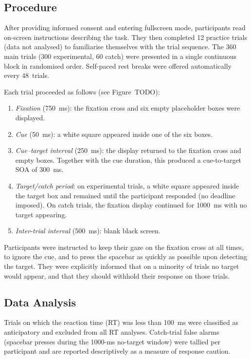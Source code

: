 \documentclass[12pt, a4paper]{article}
\begin{document}
\subsection{Procedure}
\label{sec:procedure}

After providing informed consent and entering fullscreen mode,
participants read on-screen instructions describing the task.
They then completed 12 practice trials (data not analysed) to
familiarise themselves with the trial sequence.
The 360 main trials (300 experimental, 60 catch) were presented in a
single continuous block in randomised order.
Self-paced rest breaks were offered automatically every 48~trials.

Each trial proceeded as follows (see Figure~TODO):
\begin{enumerate}
    \item \textit{Fixation} (750~ms): the fixation cross and six empty
          placeholder boxes were displayed.
    \item \textit{Cue} (50~ms): a white square appeared inside one of
          the six boxes.
    \item \textit{Cue--target interval} (250~ms): the display returned
          to the fixation cross and empty boxes.
          Together with the cue duration, this produced a cue-to-target
          SOA of 300~ms.
    \item \textit{Target/catch period}: on experimental trials, a white
          square appeared inside the target box and remained until the
          participant responded (no deadline imposed).
          On catch trials, the fixation display continued for 1000~ms
          with no target appearing.
    \item \textit{Inter-trial interval} (500~ms): blank black screen.
\end{enumerate}

Participants were instructed to keep their gaze on the fixation cross
at all times, to ignore the cue, and to press the spacebar as quickly
as possible upon detecting the target.
They were explicitly informed that on a minority of trials no target
would appear, and that they should withhold their response on those
trials.

\subsection{Data Analysis}

Trials on which the reaction time (RT) was less than 100~ms were
classified as anticipatory and excluded from all RT analyses.
Catch-trial false alarms (spacebar presses during the 1000-ms
no-target window) were tallied per participant and are reported
descriptively as a measure of response caution.
\end{document}
